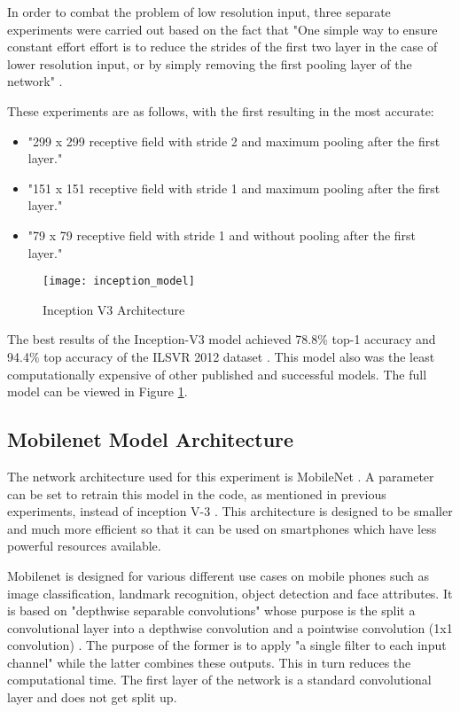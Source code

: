 In order to combat the problem of low resolution input, three separate experiments were carried out based on the fact that "One simple way to ensure constant effort effort is to reduce the strides of the first two layer in the case of lower resolution input, or by simply removing the first pooling layer of the network" \parencite{rethinkingInception}.

These experiments are as follows, with the first resulting in the most accurate:
\begin{itemize}
    \item{"299 x 299 receptive field with stride 2 and maximum pooling after the first layer." \parencite{rethinkingInception}}
    \item{"151 x 151 receptive field with stride 1 and maximum pooling after the first layer." \parencite{rethinkingInception}}
    \item{"79 x 79 receptive field with stride 1 and without pooling after the first layer." \parencite{rethinkingInception}}
\end{itemize}

\begin{figure}
     \texttt{[image: inception\_model]}
     \caption{Inception V3 Architecture \parencite{rethinkingInception}}
     \label{fig:inception_model}
\end{figure}

The best results of the Inception-V3 model achieved 78.8\% top-1 accuracy and 94.4\% top accuracy of the ILSVR 2012 dataset \parencite{rethinkingInception}.
This model also was the least computationally expensive of other published and successful models.
The full model can be viewed in Figure \ref{fig:inception_model}.

\subsection*{Mobilenet Model Architecture}
The network architecture used for this experiment is MobileNet \parencite{mobilenet}.
A parameter can be set to retrain this model in the code, as mentioned in previous experiments, instead of inception V-3 \parencite{retrainInception}. 
This architecture is designed to be smaller and much more efficient so that
it can be used on smartphones which have less powerful resources available.

Mobilenet is designed for various different use cases on mobile phones such as image classification, landmark recognition, object detection and face attributes.
It is based on "depthwise separable convolutions" whose purpose is the split a convolutional layer into a depthwise convolution and a pointwise convolution (1x1 convolution) \parencite{mobilenet}.
The purpose of the former is to apply "a single filter to each input channel" \parencite{mobilenet} while the latter combines these outputs.
This in turn reduces the computational time.
The first layer of the network is a standard convolutional layer and does not get split up.

